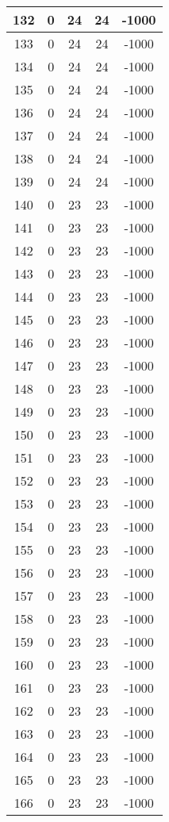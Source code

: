 \documentclass[letterpaper, 12pt]{article}
\begin{document}
\begin{longtable}{|c|c|c|c|c|}
\hline
132 & 0 & 24 & 24 & -1000 \\
\hline
133 & 0 & 24 & 24 & -1000 \\
\hline
134 & 0 & 24 & 24 & -1000 \\
\hline
135 & 0 & 24 & 24 & -1000 \\
\hline
136 & 0 & 24 & 24 & -1000 \\
\hline
137 & 0 & 24 & 24 & -1000 \\
\hline
138 & 0 & 24 & 24 & -1000 \\
\hline
139 & 0 & 24 & 24 & -1000 \\
\hline
140 & 0 & 23 & 23 & -1000 \\
\hline
141 & 0 & 23 & 23 & -1000 \\
\hline
142 & 0 & 23 & 23 & -1000 \\
\hline
143 & 0 & 23 & 23 & -1000 \\
\hline
144 & 0 & 23 & 23 & -1000 \\
\hline
145 & 0 & 23 & 23 & -1000 \\
\hline
146 & 0 & 23 & 23 & -1000 \\
\hline
147 & 0 & 23 & 23 & -1000 \\
\hline
148 & 0 & 23 & 23 & -1000 \\
\hline
149 & 0 & 23 & 23 & -1000 \\
\hline
150 & 0 & 23 & 23 & -1000 \\
\hline
151 & 0 & 23 & 23 & -1000 \\
\hline
152 & 0 & 23 & 23 & -1000 \\
\hline
153 & 0 & 23 & 23 & -1000 \\
\hline
154 & 0 & 23 & 23 & -1000 \\
\hline
155 & 0 & 23 & 23 & -1000 \\
\hline
156 & 0 & 23 & 23 & -1000 \\
\hline
157 & 0 & 23 & 23 & -1000 \\
\hline
158 & 0 & 23 & 23 & -1000 \\
\hline
159 & 0 & 23 & 23 & -1000 \\
\hline
160 & 0 & 23 & 23 & -1000 \\
\hline
161 & 0 & 23 & 23 & -1000 \\
\hline
162 & 0 & 23 & 23 & -1000 \\
\hline
163 & 0 & 23 & 23 & -1000 \\
\hline
164 & 0 & 23 & 23 & -1000 \\
\hline
165 & 0 & 23 & 23 & -1000 \\
\hline
166 & 0 & 23 & 23 & -1000 \\

\end{longtable}
\end{document}
